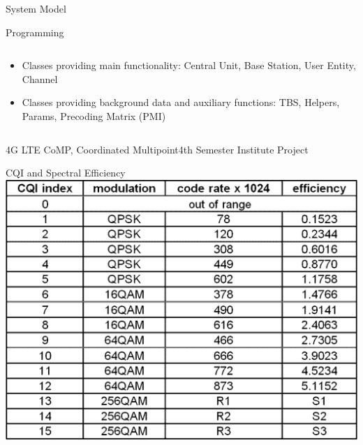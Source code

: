 \documentclass[xcolor={cmyk}]{beamer}
\begin{document}
 \begin{frame}{System Model}
	 \begin{block}{Programming}
	 	\begin{columns}
			\begin{column}{.9\textwidth}
				\begin{itemize}
					\item Classes providing main functionality: Central Unit, Base Station, User Entity, Channel
					\item Classes providing background data and auxiliary functions: TBS, Helpers, Params, Precoding Matrix (PMI)
				\end{itemize}
			\end{column}
		\end{columns}
	 \end{block}
 \end{frame}
 
  \begin{frame}{4G LTE CoMP, Coordinated Multipoint}{4th Semester Institute Project}
	 \begin{block}{CQI and Spectral Efficiency}
		 \includegraphics[width=\linewidth]{cqi.png}
	 \end{block}
 \end{frame}
 
\end{document}
